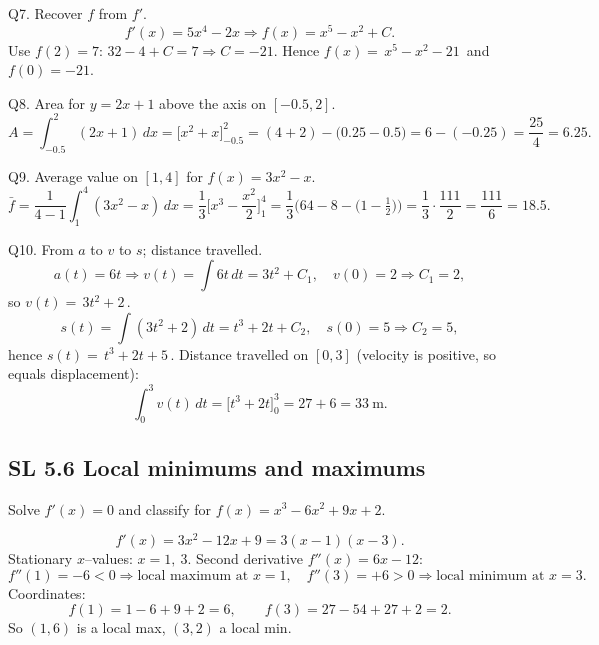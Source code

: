 \documentclass[11pt]{article}
\def\textbf#1{#1}%
\newcommand{\tocsubsection}[1]{\subsection{#1}}
\begin{document}
\begin{solution}
\textbf{Q7. Recover $f$ from $f'$.}
\[
f'(x)=5x^{4}-2x \Rightarrow f(x)=x^{5}-x^{2}+C.
\]
Use $f(2)=7$: $32-4+C=7 \Rightarrow C=-21$.  
Hence $f(x)=\boxed{\,x^{5}-x^{2}-21\,}$ and $f(0)=\boxed{-21}$.
\end{solution}

\begin{solution}
\textbf{Q8. Area for $y=2x+1$ above the axis on $[-0.5,2]$.}
\[
A=\int_{-0.5}^{2}(2x+1)\,dx=\big[x^{2}+x\big]_{-0.5}^{2}
=(4+2)-\big(0.25-0.5\big)=6-(-0.25)=\boxed{\frac{25}{4}}=6.25.
\]
\end{solution}

\begin{solution}
\textbf{Q9. Average value on $[1,4]$ for $f(x)=3x^{2}-x$.}
\[
\bar f=\frac{1}{4-1}\int_{1}^{4}(3x^{2}-x)\,dx
=\frac{1}{3}\Big[x^{3}-\frac{x^{2}}{2}\Big]_{1}^{4}
=\frac{1}{3}\Big(64-8-\big(1-\tfrac12\big)\Big)
=\frac{1}{3}\cdot\frac{111}{2}=\boxed{\frac{111}{6}}= \boxed{18.5}.
\]
\end{solution}

\begin{solution}
\textbf{Q10. From $a$ to $v$ to $s$; distance travelled.}
\[
a(t)=6t \Rightarrow v(t)=\int 6t\,dt=3t^{2}+C_1,\quad v(0)=2\Rightarrow C_1=2,
\]
so $v(t)=\boxed{\,3t^{2}+2\,}$.  
\[
s(t)=\int (3t^{2}+2)\,dt=t^{3}+2t+C_2,\quad s(0)=5\Rightarrow C_2=5,
\]
hence $s(t)=\boxed{\,t^{3}+2t+5\,}$.  
Distance travelled on $[0,3]$ (velocity is positive, so equals displacement):
\[
\int_{0}^{3} v(t)\,dt=\Big[t^{3}+2t\Big]_{0}^{3}=27+6=\boxed{33\ \text{m}}.
\]
\end{solution}



\tocsubsection{SL 5.6 Local minimums and maximums}


\begin{solution}
\textbf{Solve $f'(x)=0$ and classify for $f(x)=x^{3}-6x^{2}+9x+2$.}

\[
f'(x)=3x^{2}-12x+9=3(x-1)(x-3).
\]
Stationary $x$–values: $\boxed{x=1,\ 3}$.  
Second derivative $f''(x)=6x-12$:
\[
f''(1)=-6<0\Rightarrow \text{local maximum at }x=1,\quad
f''(3)=+6>0\Rightarrow \text{local minimum at }x=3.
\]
Coordinates:
\[
f(1)=1-6+9+2= \boxed{6},\qquad f(3)=27-54+27+2=\boxed{2}.
\]
So $(1,6)$ is a local max, $(3,2)$ a local min.
\end{solution}
\end{document}
